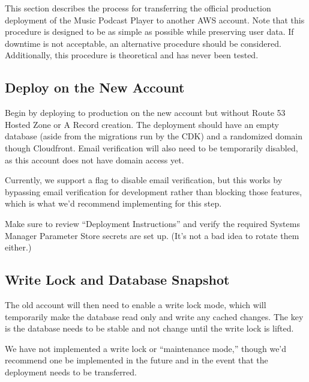 \documentclass{article}
\begin{document}
% 

This section describes the process for transferring the
official production deployment of the Music Podcast Player
to another AWS account. Note that this procedure is
designed to be as simple as possible while preserving user
data. If downtime is not acceptable, an alternative
procedure should be considered. Additionally, this
procedure is theoretical and has never been tested.

\subsection{Deploy on the New Account}

Begin by deploying to production on the new account but
without Route 53 Hosted Zone or A Record creation. The
deployment should have an empty database (aside from the
migrations run by the CDK) and a randomized domain though
Cloudfront. Email verification will also need to be
temporarily disabled, as this account does not have domain
access yet.

Currently, we support a flag to disable email
verification, but this works by bypassing email
verification for development rather than blocking those
features, which is what we'd recommend implementing for
this step.

Make sure to review ``Deployment Instructions'' and verify
the required Systems Manager Parameter Store secrets are
set up. (It's not a bad idea to rotate them either.)

\subsection{Write Lock and Database Snapshot}

The old account will then need to enable a write lock
mode, which will temporarily make the database read only
and write any cached changes. The key is the database
needs to be stable and not change until the write lock is
lifted.

We have not implemented a write lock or ``maintenance
mode,'' though we'd recommend one be implemented in the
future and in the event that the deployment needs to be
transferred.
\end{document}
